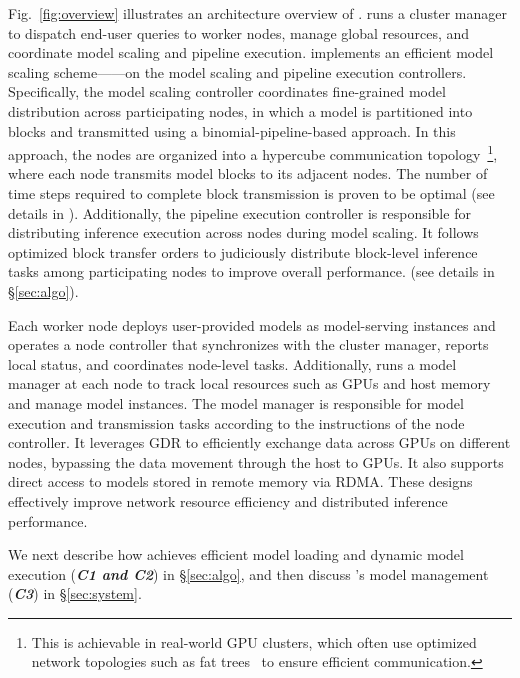 Fig.~\ref{fig:overview} illustrates an architecture overview of \SysName. 
\SysName runs a cluster manager to dispatch end-user queries to worker nodes, manage global resources, and coordinate model scaling and pipeline execution.
\SysName implements an efficient model scaling scheme---\AlgoName---on the model scaling and pipeline execution controllers. 
Specifically, the model scaling controller coordinates fine-grained model distribution across participating nodes, in which a model is partitioned into blocks and transmitted using a binomial-pipeline-based approach.
In this approach, the nodes are organized into a hypercube communication topology~\footnote{This is achievable in real-world GPU clusters, which often use optimized network topologies such as fat trees~\cite{fattree} to ensure efficient communication.}, where each node transmits model blocks to its adjacent nodes.
The number of time steps required to complete block transmission is proven to be optimal (see details in \cite{binomial-pipe}).
Additionally, the pipeline execution controller is responsible for distributing inference execution across nodes during model scaling.
It follows optimized block transfer orders to judiciously distribute block-level inference tasks among participating nodes to improve overall performance. (see details in \S\ref{sec:algo}).

Each worker node deploys user-provided models as model-serving instances and operates a node controller that synchronizes with the cluster manager, reports local status, and coordinates node-level tasks.
Additionally, \SysName runs a model manager at each node to track local resources such as GPUs and host memory and manage model instances.
The model manager is responsible for model execution and transmission tasks according to the instructions of the node controller.
It leverages GDR to efficiently exchange data across GPUs on different nodes, bypassing the data movement through the host to GPUs.
It also supports direct access to models stored in remote memory via RDMA.
These designs effectively improve network resource efficiency and distributed inference performance.

We next describe how \AlgoName achieves efficient model loading and dynamic model execution (\textbf{\emph{C1 and C2}}) in \S\ref{sec:algo}, and then discuss \SysName's model management (\textbf{\emph{C3}}) in \S\ref{sec:system}.


